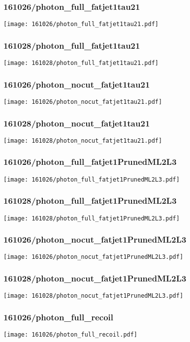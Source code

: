 \begin{frame}
   \frametitle{\small 161026/photon\_full\_fatjet1tau21}
   \centering
   \texttt{[image: 161026/photon\_full\_fatjet1tau21.pdf]}
\end{frame}

\begin{frame}
   \frametitle{\small 161028/photon\_full\_fatjet1tau21}
   \centering
   \texttt{[image: 161028/photon\_full\_fatjet1tau21.pdf]}
\end{frame}

\begin{frame}
   \frametitle{\small 161026/photon\_nocut\_fatjet1tau21}
   \centering
   \texttt{[image: 161026/photon\_nocut\_fatjet1tau21.pdf]}
\end{frame}

\begin{frame}
   \frametitle{\small 161028/photon\_nocut\_fatjet1tau21}
   \centering
   \texttt{[image: 161028/photon\_nocut\_fatjet1tau21.pdf]}
\end{frame}

\begin{frame}
   \frametitle{\small 161026/photon\_full\_fatjet1PrunedML2L3}
   \centering
   \texttt{[image: 161026/photon\_full\_fatjet1PrunedML2L3.pdf]}
\end{frame}

\begin{frame}
   \frametitle{\small 161028/photon\_full\_fatjet1PrunedML2L3}
   \centering
   \texttt{[image: 161028/photon\_full\_fatjet1PrunedML2L3.pdf]}
\end{frame}

\begin{frame}
   \frametitle{\small 161026/photon\_nocut\_fatjet1PrunedML2L3}
   \centering
   \texttt{[image: 161026/photon\_nocut\_fatjet1PrunedML2L3.pdf]}
\end{frame}

\begin{frame}
   \frametitle{\small 161028/photon\_nocut\_fatjet1PrunedML2L3}
   \centering
   \texttt{[image: 161028/photon\_nocut\_fatjet1PrunedML2L3.pdf]}
\end{frame}

\begin{frame}
   \frametitle{\small 161026/photon\_full\_recoil}
   \centering
   \texttt{[image: 161026/photon\_full\_recoil.pdf]}
\end{frame}

